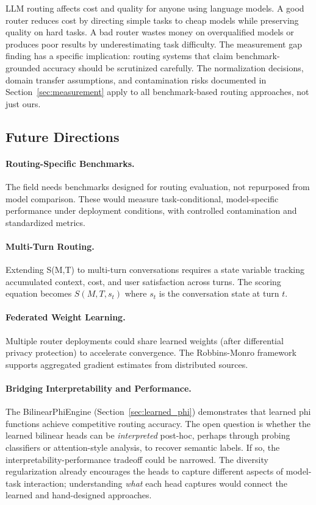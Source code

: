 LLM routing affects cost and quality for anyone using language models. A good router reduces cost by directing simple tasks to cheap models while preserving quality on hard tasks. A bad router wastes money on overqualified models or produces poor results by underestimating task difficulty. The measurement gap finding has a specific implication: routing systems that claim benchmark-grounded accuracy should be scrutinized carefully. The normalization decisions, domain transfer assumptions, and contamination risks documented in Section~\ref{sec:measurement} apply to all benchmark-based routing approaches, not just ours.

\subsection{Future Directions}

\paragraph{Routing-Specific Benchmarks.} The field needs benchmarks designed for routing evaluation, not repurposed from model comparison. These would measure task-conditional, model-specific performance under deployment conditions, with controlled contamination and standardized metrics.

\paragraph{Multi-Turn Routing.} Extending S(M,T) to multi-turn conversations requires a state variable tracking accumulated context, cost, and user satisfaction across turns. The scoring equation becomes $S(M, T, s_t)$ where $s_t$ is the conversation state at turn $t$.

\paragraph{Federated Weight Learning.} Multiple router deployments could share learned weights (after differential privacy protection) to accelerate convergence. The Robbins-Monro framework supports aggregated gradient estimates from distributed sources.

\paragraph{Bridging Interpretability and Performance.} The BilinearPhiEngine (Section~\ref{sec:learned_phi}) demonstrates that learned phi functions achieve competitive routing accuracy. The open question is whether the learned bilinear heads can be \emph{interpreted} post-hoc, perhaps through probing classifiers or attention-style analysis, to recover semantic labels. If so, the interpretability-performance tradeoff could be narrowed. The diversity regularization already encourages the heads to capture different aspects of model-task interaction; understanding \emph{what} each head captures would connect the learned and hand-designed approaches.

